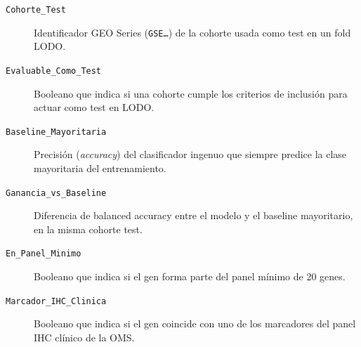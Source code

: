 \begin{description}
  \item[\texttt{Cohorte\_Test}] Identificador GEO Series
  (\texttt{GSE\ldots}) de la cohorte usada como test en un fold LODO.
  \item[\texttt{Evaluable\_Como\_Test}] Booleano que indica si una
  cohorte cumple los criterios de inclusión para actuar como test en
  LODO.
  \item[\texttt{Baseline\_Mayoritaria}] Precisión (\emph{accuracy}) del
  clasificador ingenuo que siempre predice la clase mayoritaria del
  entrenamiento.
  \item[\texttt{Ganancia\_vs\_Baseline}] Diferencia de balanced accuracy
  entre el modelo y el baseline mayoritario, en la misma cohorte test.
  \item[\texttt{En\_Panel\_Minimo}] Booleano que indica si el gen forma
  parte del panel mínimo de 20 genes.
  \item[\texttt{Marcador\_IHC\_Clinica}] Booleano que indica si el gen
  coincide con uno de los marcadores del panel IHC clínico de la OMS.
\end{description}
